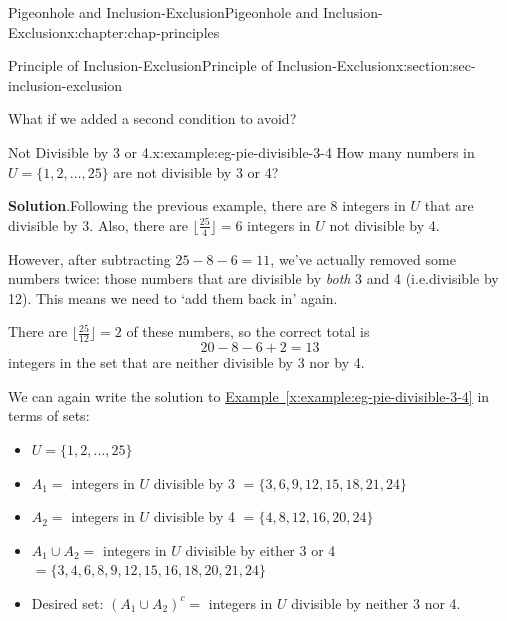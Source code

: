 \documentclass[oneside,10pt,]{book}
\newcommand{\blocktitlefont}{\relax}
\newcommand{\xreffont}{\relax}
\numberwithin{equation}{section}
\begin{document}
\begin{chapterptx}{Pigeonhole and Inclusion-Exclusion}{}{Pigeonhole and Inclusion-Exclusion}{}{}{x:chapter:chap-principles}
\begin{sectionptx}{Principle of Inclusion-Exclusion}{}{Principle of Inclusion-Exclusion}{}{}{x:section:sec-inclusion-exclusion}
%
\par
What if we added a second condition to avoid?%
\begin{example}{Not Divisible by 3 or 4.}{x:example:eg-pie-divisible-3-4}%
How many numbers in \(U = \{1,2,\ldots,25\}\) are not divisible by 3 or 4?%
\par\smallskip%
\noindent\textbf{\blocktitlefont Solution}.\hypertarget{g:solution:id438545}{}\quad{}Following the previous example, there are \(8\) integers in \(U\) that are divisible by 3. Also, there are \(\lfloor \frac{25}{4} \rfloor = 6\) integers in \(U\) not divisible by 4.%
\par
However, after subtracting \(25 - 8 - 6 = 11\), we've actually removed some numbers twice: those numbers that are divisible by \emph{both} 3 and 4 (i.e.\@ divisible by 12). This means we need to `add them back in' again.%
\par
There are \(\lfloor \frac{25}{12} \rfloor = 2\) of these numbers, so the correct total is%
\begin{equation*}
20 - 8 - 6 + 2 = 13
\end{equation*}
integers in the set that are neither divisible by 3 nor by 4.%
\end{example}
We can again write the solution to \hyperref[x:example:eg-pie-divisible-3-4]{Example~{\xreffont\ref{x:example:eg-pie-divisible-3-4}}} in terms of sets:%
\begin{itemize}[label=\textbullet]
\item{}\(\displaystyle U = \{1,2,\ldots,25\}\)%
\item{}\(A_1 = \) integers in \(U\) divisible by 3 \(= \{3,6,9,12,15,18,21,24\}\)%
\item{}\(A_2 = \) integers in \(U\) divisible by 4 \(= \{4,8,12,16,20,24\}\)%
\item{}\(A_1 \cup A_2 = \) integers in \(U\) divisible by either 3 or 4 \(= \{3,4,6,8,9,12,15,16,18,20,21,24\}\)%
\item{}Desired set: \((A_1 \cup A_2)^c = \) integers in \(U\) divisible by neither 3 nor 4.%
\end{itemize}
%
\begin{sidebyside}{1}{0.25}{0.25}{0}%
\begin{sbspanel}{0.5}%
\end{sbspanel}
\end{sidebyside}
\end{sectionptx}
\end{chapterptx}
\end{document}
